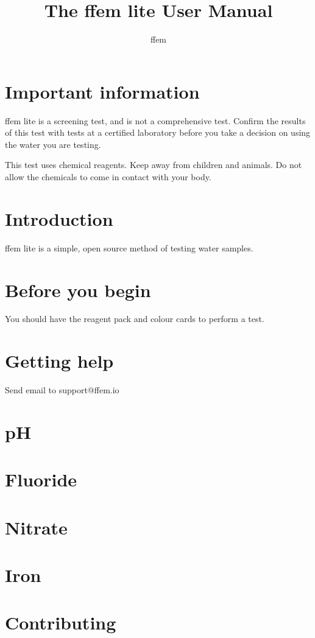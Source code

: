 \documentclass{article}
\title{The ffem lite User Manual}
\author{ffem}
\begin{document}
    \maketitle


    \section{Important information}
ffem lite is a screening test, and is not a comprehensive test. Confirm the results of this test with tests at a certified laboratory before you take a decision on using the water you are testing.

This test uses chemical reagents. Keep away from children and animals. Do not allow the chemicals to come in contact with your body.


    \section{Introduction}
ffem lite is a simple, open source method of testing water samples.


    \section{Before you begin}
You should have the reagent pack and colour cards to perform a test.


    \section{Getting help}
Send email to support@ffem.io


    \section{pH}


    \section{Fluoride}


    \section{Nitrate}


    \section{Iron}


    \section{Contributing}
\end{document}

